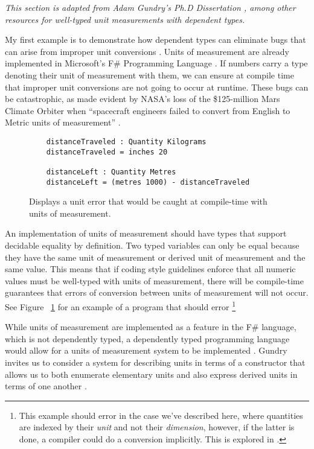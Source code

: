 \textit{This section is adapted from Adam Gundry's Ph.D Dissertation
\cite{gundry2013}, among other resources for well-typed unit measurements with
dependent types.}

My first example is to demonstrate how dependent types can eliminate bugs that
can arise from improper unit conversions \cite{gundry2013}. Units of measurement
are already implemented in Microsoft's F\# Programming Language
\cite{kennedy2009}. If numbers carry a type denoting their unit of measurement
with them, we can ensure at compile time that improper unit conversions are not
going to occur at runtime. These bugs can be catastrophic, as made evident by
NASA's loss of the \$125-million Mars Climate Orbiter when ``spacecraft
engineers failed to convert from English to Metric units of measurement''
\cite{hotz1999}. 

\begin{figure}[ht!]
  \caption{Displays a unit error that would be caught at compile-time with units of measurement.}
  \label{unit_error}
  \begin{lstlisting}
    distanceTraveled : Quantity Kilograms
    distanceTraveled = inches 20

    distanceLeft : Quantity Metres
    distanceLeft = (metres 1000) - distanceTraveled
  \end{lstlisting}
\end{figure}

An implementation of units of measurement should have types that support
decidable equality by definition. Two typed variables can only be equal because
they have the same unit of measurement or derived unit of measurement and the
same value. This means that if coding style guidelines enforce that all numeric
values must be well-typed with units of measurement, there will be compile-time
guarantees that errors of conversion between units of measurement will not
occur. See Figure ~\ref{unit_error} for an example of a program that should
error \footnote{This example should error in the case we've described here,
where quantities are indexed by their \textit{unit} and not their
\textit{dimension}, however, if the latter is done, a compiler could do a
conversion implicitly. This is explored in \cite{eisenberg2014}.}

While units of measurement are implemented as a feature in the F\# language,
which is not dependently typed, a dependently typed programming language would
allow for a units of measurement system to be implemented \cite{gundry2013}.
Gundry invites us to consider a system for describing units in terms of a
constructor that allows us to both enumerate elementary units and also express
derived units in terms of one another \cite{gundry2013}. 

